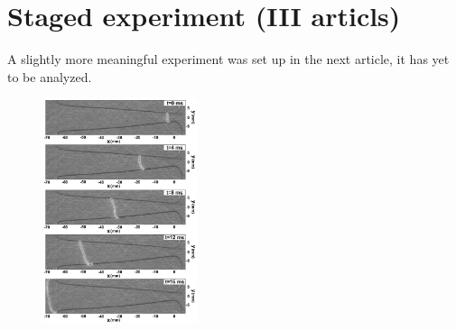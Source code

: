 \section{Staged experiment (III articls)}


A slightly more meaningful experiment was set up in the next article, it has yet to be analyzed.

\begin{figure}[h]
    \centering
    \includegraphics[width=0.4\textwidth]{figures/2.png}
\end{figure}


